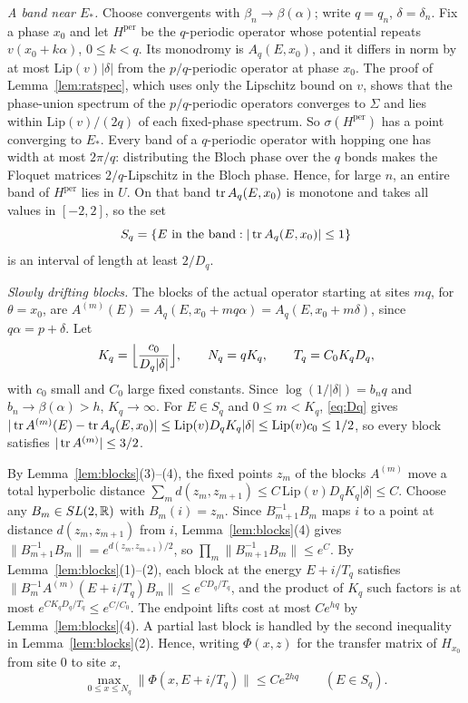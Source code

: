 \emph{A band near $E_*$.} Choose convergents with $\beta_n\to\beta(\alpha)$; write $q=q_n$, $\delta=\delta_n$. Fix a phase $x_0$ and let $H^{\mathrm{per}}$ be the $q$-periodic operator whose potential repeats $v(x_0+k\alpha)$, $0\le k<q$. Its monodromy is $A_q(E,x_0)$, and it differs in norm by at most $\mathrm{Lip}(v)|\delta|$ from the $p/q$-periodic operator at phase $x_0$. The proof of Lemma~\ref{lem:ratspec}, which uses only the Lipschitz bound on $v$, shows that the phase-union spectrum of the $p/q$-periodic operators converges to $\Sigma$ and lies within $\mathrm{Lip}(v)/(2q)$ of each fixed-phase spectrum. So $\sigma(H^{\mathrm{per}})$ has a point converging to $E_*$. Every band of a $q$-periodic operator with hopping one has width at most $2\pi/q$: distributing the Bloch phase over the $q$ bonds makes the Floquet matrices $2/q$-Lipschitz in the Bloch phase. Hence, for large $n$, an entire band of $H^{\mathrm{per}}$ lies in $U$. On that band $\operatorname{tr} A_q(E,x_0)$ is monotone and takes all values in $[-2,2]$, so the set
\[
S_q=\{E\text{ in the band}:|\operatorname{tr} A_q(E,x_0)|\le1\}
\]
is an interval of length at least $2/D_q$.

\emph{Slowly drifting blocks.} The blocks of the actual operator starting at sites $mq$, for $\theta=x_0$, are $A^{(m)}(E)=A_q(E,x_0+mq\alpha)=A_q(E,x_0+m\delta)$, since $q\alpha=p+\delta$. Let
\[
K_q=\Bigl\lfloor\frac{c_0}{D_q|\delta|}\Bigr\rfloor,\qquad N_q=qK_q,\qquad T_q=C_0K_qD_q,
\]
with $c_0$ small and $C_0$ large fixed constants. Since $\log(1/|\delta|)=b_nq$ and $b_n\to\beta(\alpha)>h$, $K_q\to\infty$. For $E\in S_q$ and $0\le m<K_q$, \eqref{eq:Dq} gives $|\operatorname{tr} A^{(m)}(E)-\operatorname{tr} A_q(E,x_0)|\le\mathrm{Lip}(v)D_qK_q|\delta|\le\mathrm{Lip}(v)c_0\le1/2$, so every block satisfies $|\operatorname{tr} A^{(m)}|\le3/2$.

By Lemma~\ref{lem:blocks}(3)--(4), the fixed points $z_m$ of the blocks $A^{(m)}$ move a total hyperbolic distance $\sum_md(z_m,z_{m+1})\le C\,\mathrm{Lip}(v)D_qK_q|\delta|\le C$. Choose any $B_m\in SL(2,\mathbb R)$ with $B_m(i)=z_m$. Since $B_{m+1}^{-1}B_m$ maps $i$ to a point at distance $d(z_m,z_{m+1})$ from $i$, Lemma~\ref{lem:blocks}(4) gives $\|B_{m+1}^{-1}B_m\|=e^{d(z_m,z_{m+1})/2}$, so $\prod_m\|B_{m+1}^{-1}B_m\|\le e^{C}$. By Lemma~\ref{lem:blocks}(1)--(2), each block at the energy $E+i/T_q$ satisfies $\|B_m^{-1}A^{(m)}(E+i/T_q)B_m\|\le e^{CD_q/T_q}$, and the product of $K_q$ such factors is at most $e^{CK_qD_q/T_q}\le e^{C/C_0}$. The endpoint lifts cost at most $Ce^{hq}$ by Lemma~\ref{lem:blocks}(4). A partial last block is handled by the second inequality in Lemma~\ref{lem:blocks}(2). Hence, writing $\Phi(x,z)$ for the transfer matrix of $H_{x_0}$ from site $0$ to site $x$,
\begin{equation}\label{eq:L7}
\max_{0\le x\le N_q}\|\Phi(x,E+i/T_q)\|\le Ce^{2hq}\qquad(E\in S_q).
\end{equation}

